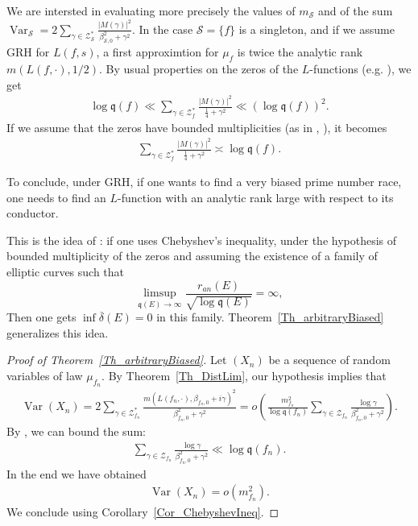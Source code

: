 \documentclass[a4paper,10pt]{amsart}
\theoremstyle{plain}
\theoremstyle{definition}
\begin{document}
We are intersted in evaluating more precisely the values of $m_{\mathcal{S}}$ 
and of the sum $\operatorname{Var}_{\mathcal{S}}=2\sum_{\gamma \in \mathcal{Z}_{\mathcal{S}}^{*}}\frac{\lvert M(\gamma)\rvert^{2}}{\beta_{\mathcal{S},0}^{2}+\gamma^{2}}$.
In the case $\mathcal{S} = \lbrace f \rbrace$ is a singleton, and if we assume GRH for $L(f,s)$, 
a first approximtion for $\mu_{f}$ is twice the analytic rank $m(L(f,\cdot),1/2)$.
By usual properties on the zeros of the $L$-functions (e.g. \cite[(5.27)]{IK}), we get
\begin{align*}
\log \mathfrak{q}(f)
\ll  \sum_{\gamma \in \mathcal{Z}_{f}^{*}}\frac{\lvert M(\gamma)\rvert^{2}}{\frac{1}{4}+\gamma^{2}} \ll
(\log \mathfrak{q}(f))^{2}.
\end{align*}
If we assume that the zeros have bounded multiplicities (as in \cite[Th. 1.2]{Fiorilli_HighlyBiased}, \cite{FioEC}),
it becomes 
\begin{align*}
\sum_{\gamma \in \mathcal{Z}_{f}^{*}}\frac{\lvert M(\gamma)\rvert^{2}}{\frac{1}{4}+\gamma^{2}} \asymp
\log \mathfrak{q}(f).
\end{align*}

To conclude, under GRH, if one wants to find a very biased prime number race, one needs to find an $L$-function with an analytic rank large with respect to its conductor.

This is the idea of \cite[Th. 1.2]{FioEC}: if one uses Chebyshev's inequality, 
under the hypothesis of bounded multiplicity of the zeros and assuming the existence of a family of elliptic curves such that
$$\limsup_{\mathfrak{q}(E)\rightarrow \infty} \frac{r_{an}(E)}{\sqrt{\log \mathfrak{q}(E)}} = \infty,$$
Then one gets $\inf \overline{\delta}(E) = 0$ in this family.
Theorem~\ref{Th_arbitraryBiased} generalizes this idea.

\begin{proof}[Proof of Theorem~\ref{Th_arbitraryBiased}]
Let $(X_{n})$ be a sequence of random variables of law $\mu_{f_{n}}$.
By Theorem~\ref{Th_DistLim}, our hypothesis implies that
\begin{align*}
\operatorname{Var}(X_{n}) 
= 2\sum_{\gamma \in \mathcal{Z}_{f_{n}}^{*}}\frac{m(L(f_{n},\cdot),\beta_{f_{n},0} + i\gamma)^{2}}{\beta_{f_{n},0}^{2}+\gamma^{2}}
= o\left( \frac{m_{f_{n}}^{2}}{\log \mathfrak{q}(f_{n})}\sum_{\gamma \in \mathcal{Z}_{f_{n}}}\frac{ \log \gamma}{\beta_{f_{n},0}^{2}+\gamma^{2}}  \right).
\end{align*}
By \cite[(5.27)]{IK}, we can bound the sum:
\begin{align*}
\sum_{\gamma \in \mathcal{Z}_{f_{n}}}\frac{ \log \gamma}{\beta_{f_{n},0}^{2}+\gamma^{2}} \ll \log \mathfrak{q}(f_{n}).
\end{align*}
In the end we have obtained
\begin{align*}
\operatorname{Var}(X_{n})  = o(m_{f_{n}}^{2}).
\end{align*}
We conclude using Corollary~\ref{Cor_ChebyshevIneq}.
\end{proof}
\end{document}
